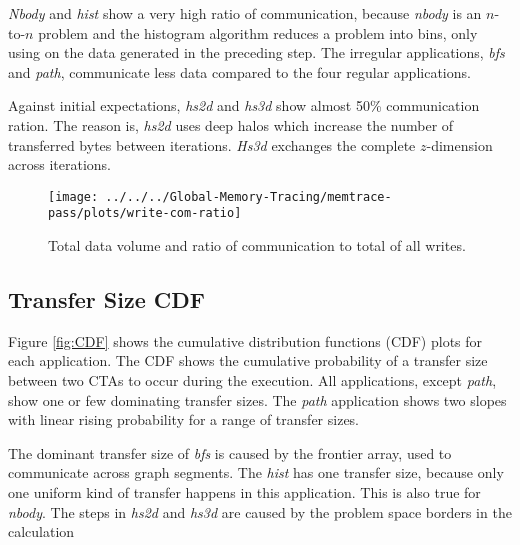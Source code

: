 \textit{Nbody} and \textit{hist} show a very high ratio of communication, because \textit{nbody} is an $n$-to-$n$ problem and the histogram algorithm reduces a problem into bins, only using on the data generated in the preceding step. The irregular applications, \textit{bfs} and \textit{path}, communicate less data compared to the four regular applications.

Against initial expectations,  \textit{hs2d} and \textit{hs3d} show almost 50\% communication ration. The reason is, \textit{hs2d} uses deep halos which increase the number of transferred bytes between iterations. \textit{Hs3d} exchanges the complete $z$-dimension across iterations. 


\begin{figure}[t]
	\centering
	\texttt{[image: ../../../Global-Memory-Tracing/memtrace-pass/plots/write-com-ratio]}
	\caption{Total data volume and ratio of communication to total of all writes.}
	\label{com-ratio}
\end{figure}
\subsection{Transfer Size CDF}
Figure \ref{fig:CDF} shows the cumulative distribution functions (CDF) plots for each application. The CDF shows the cumulative probability of a transfer size between two CTAs to occur during the execution. All applications, except \textit{path}, show one or few dominating transfer sizes. The \textit{path} application shows two slopes with linear rising probability for a range of transfer sizes.

The dominant transfer size of \textit{bfs} is caused by the frontier array, used to communicate across graph segments. The \textit{hist} has one transfer size, because only one uniform kind of transfer happens in this application. This is also true for \textit{nbody}. The steps in \textit{hs2d} and \textit{hs3d} are caused by the problem space borders in the calculation

